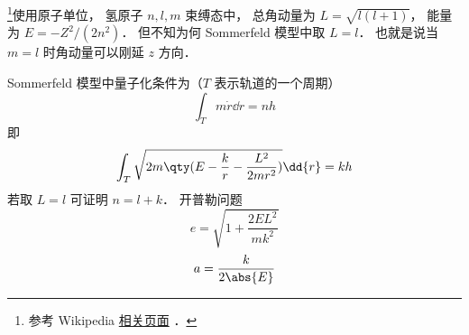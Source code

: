 
\begin{issues}
\issueDraft
\end{issues}

\footnote{参考 Wikipedia \href{https://en.wikipedia.org/wiki/Old_quantum_theory}{相关页面}
．}使用原子单位， 氢原子 $n,l,m$ 束缚态中， 总角动量为 $L = \sqrt{l(l+1)}$， 能量为 $E = -Z^2/(2n^2)$． 但不知为何 Sommerfeld 模型中取 $L = l$． 也就是说当 $m = l$ 时角动量可以刚延 $z$ 方向．

Sommerfeld 模型中量子化条件为（$T$ 表示轨道的一个周期）
\begin{equation}
\int_T m\dot r \dd{r} = nh
\end{equation}
即
\begin{equation}\label{BohrEc_eq1}
\int_T \sqrt{2m\qty(E - \frac{k}{r} - \frac{L^2}{2mr^2})} \dd{r} = kh
\end{equation}
若取 $L = l$ 可证明 $n = l + k$． 开普勒问题
\begin{equation}
e = \sqrt{1 + \frac{2EL^2}{mk^2}}
\end{equation}
\begin{equation}
a = \frac{k}{2\abs{E}}
\end{equation}
